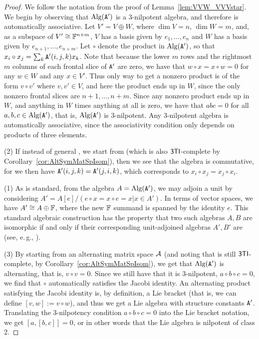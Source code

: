 \documentclass[11pt]{article}
\begin{document}
\begin{proof}
We follow the notation from the proof of Lemma~\ref{lem:VVW_VVVstar}. We begin by observing that $\text{Alg}(\mathtt{A}')$ is a 3-nilpotent algebra, and therefore is automatically associative. Let $V' = V \oplus W$, where $\dim V = n$, $\dim W = m$, and, as a subspace of $V' \cong \mathbb{F}^{n+m}$, $V$ has a basis given by $e_1, \dotsc, e_n$ and $W$ has a basis given by $e_{n+1}, \dotsc, e_{n+m}$. Let $\circ$ denote the product in $\text{Alg}(\mathtt{A}')$, so that $x_i \circ x_j = \sum_{k} \mathtt{A}'(i,j,k) x_k$. Note that because the lower $m$ rows and the rightmost $m$ columns of each frontal slice of $\mathtt{A}'$ are zero, we have that $w \circ x = x \circ w = 0$ for any $w \in W$ and any $x \in V'$. Thus only way to get a nonzero product is of the form $v \circ v'$ where $v,v' \in V$, and here the product ends up in $W$, since the only nonzero frontal slices are $n+1, \dotsc, n+m$. Since any nonzero product ends up in $W$, and anything in $W$ times anything at all is zero, we have that $abc=0$ for all $a,b,c \in \text{Alg}(\mathtt{A}')$, that is, $\text{Alg}(\mathtt{A}')$ is 3-nilpotent. Any 3-nilpotent algebra is automatically associative, since the associativity condition only depends on products of three elements.

(2) If instead of general \MatSpIsomlong, we start from \SymMatSpIsomlong (which is also $\mathsf{3TI}$-complete by Corollary~\ref{cor:AltSymMatSpIsom}), then we see that the algebra is commutative, for we then have $\mathtt{A}'(i,j,k) = \mathtt{A}'(j,i,k)$, which corresponds to $x_i \circ x_j = x_j \circ x_i$.

(1) As is standard, from the algebra $A = \text{Alg}(\mathtt{A}')$, we may adjoin a unit by considering $A' = A[e] / (e \circ x = x \circ e = x | x \in A')$. In terms of vector spaces, we have $A' \cong A \oplus \mathbb{F}$, where the new $\mathbb{F}$ summand is spanned by the identity $e$. This standard algebraic construction has the property that two such algebras $A,B$ are isomorphic if and only if their corresponding unit-adjoined algebras $A', B'$ are (see, e.\,g., \cite{dorroh1932concerning, wikipediaAdjoin}). 

(3) By starting from an alternating matrix space $\mathcal{A}$ (and noting that \AltMatSpIsomWords is still $\mathsf{3TI}$-complete, by Corollary~\ref{cor:AltSymMatSpIsom}), we get that $\text{Alg}(\mathtt{A}')$ is alternating, that is, $v \circ v = 0$. Since we still have that it is 3-nilpotent, $a \circ b \circ c = 0$, we find that $\circ$ automatically satisfies the Jacobi identity. An alternating product satisfying the Jacobi identity is, by definition, a Lie bracket (that is, we can define $[v,w] := v \circ w$), and thus we get a Lie algebra with structure constants $\mathtt{A}'$. Translating the 3-nilpotency condition $a \circ b \circ c = 0$ into the Lie bracket notation, we get $[a, [b,c]] = 0$, or in other words that the Lie algebra is nilpotent of class 2.
\end{proof}
\end{document}
